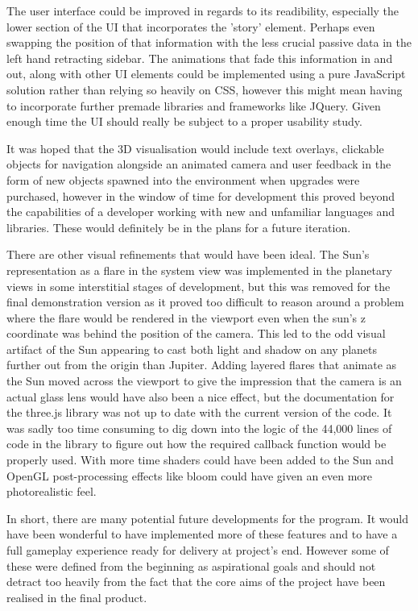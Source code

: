 \documentclass[twoside]{bhamthesis}
\begin{document}
The user interface could be improved in regards to its readibility, especially the lower section of the UI that incorporates the 'story' element. Perhaps even swapping the position of that information with the less crucial passive data in the left hand retracting sidebar. The animations that fade this information in and out, along with other UI elements could be implemented using a pure JavaScript solution rather than relying so heavily on CSS, however this might mean having to incorporate further premade libraries and frameworks like JQuery. Given enough time the UI should really be subject to a proper usability study.

It was hoped that the 3D visualisation would include text overlays, clickable objects for navigation alongside an animated camera and user feedback in the form of new objects spawned into the environment when upgrades were purchased, however in the window of time for development this proved beyond the capabilities of a developer working with new and unfamiliar languages and libraries. These would definitely be in the plans for a future iteration.

There are other visual refinements that would have been ideal. The Sun's representation as a flare in the system view was implemented in the planetary views in some interstitial stages of development, but this was removed for the final demonstration version as it proved too difficult to reason around a problem where the flare would be rendered in the viewport even when the sun's z coordinate was behind the position of the camera. This led to the odd visual artifact of the Sun appearing to cast both light and shadow on any planets further out from the origin than Jupiter. Adding layered flares that animate as the Sun moved across the viewport to give the impression that the camera is an actual glass lens would have also been a nice effect, but the documentation for the three.js library was not up to date with the current version of the code. It was sadly too time consuming to dig down into the logic of the 44,000 lines of code in the library to figure out how the required callback function would be properly used. With more time shaders could have been added to the Sun and OpenGL post-processing effects like bloom could have given an even more photorealistic feel.

In short, there are many potential future developments for the program. It would have been wonderful to have implemented more of these features and to have a full gameplay experience ready for delivery at project's end. However some of these were defined from the beginning as aspirational goals and should not detract too heavily from the fact that the core aims of the project have been realised in the final product.
\end{document}
